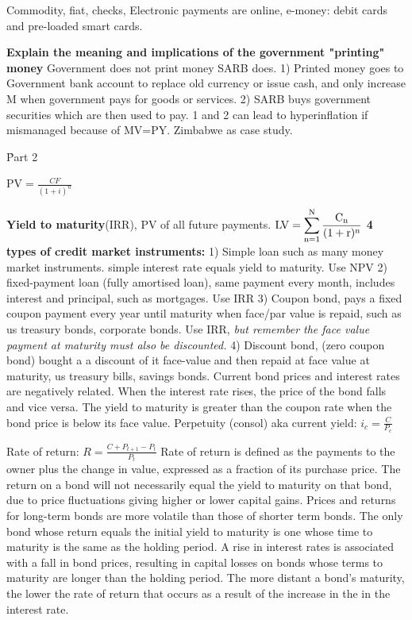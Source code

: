 \documentclass[12pt]{examnotes}
\begin{document}
Commodity, fiat, checks, Electronic payments are online, e-money: debit cards and pre-loaded smart cards. 

\textbf{Explain the meaning and implications of the government "printing" money}
Government does not print money SARB does. 1) Printed money goes to Government bank account to replace old currency or issue cash, and only increase M when government pays for goods or services. 2) SARB buys government securities which are then used to pay. 1 and 2 can lead to hyperinflation if mismanaged because of MV=PY. Zimbabwe as case study.

\h{Part 2}


$\textrm{PV}=\displaystyle\frac{CF}{(1+i)^n}$ \quad

\textbf{Yield to maturity}(IRR), PV of all future payments. $\rm{LV} = \displaystyle\sum_{n=1}^{N} \frac{C_n}{(1+r)^{n}}$ 
\textbf{4 types of credit market instruments:} 
1) Simple loan such as many money market instruments. simple interest rate equals yield to maturity. Use NPV  
2) fixed-payment loan (fully amortised loan), same payment every month, includes interest and principal, such as mortgages. Use IRR 
3) Coupon bond, pays a fixed coupon payment every year until maturity when face/par value is repaid, such as us treasury bonds, corporate bonds. Use IRR, \emph{but remember the face value payment at maturity must also be discounted.}
4) Discount bond, (zero coupon bond) bought a a discount of it face-value and then repaid at face value at maturity, us treasury bills, savings bonds. 
Current bond prices and interest rates are negatively related. When the interest rate rises, the price of the bond falls and vice versa. The yield to  maturity is greater than the coupon rate when the bond price is below its face value. 
Perpetuity (consol) aka current yield: $i_c=\displaystyle\frac{C}{P_c}$ 

Rate of return: $R=\displaystyle \frac{C+P_{t+1}-P_t}{P_t}$
Rate of return is defined as the payments to the owner plus the change in value, expressed as a fraction of its purchase price.
The return on a bond will not necessarily equal the yield to maturity on that bond, due to price fluctuations giving higher or lower capital gains. Prices and returns for long-term bonds are more volatile than those of shorter term bonds. 
The only bond whose return equals the initial yield to maturity is one whose time to maturity is the same as the holding period.
A rise in interest rates is associated with a fall in bond prices, resulting in capital losses on bonds whose terms to maturity are longer than the holding period.
The more distant a bond's maturity, the lower the rate of return that occurs as a result of the increase in the in the interest rate. 
\end{document}
